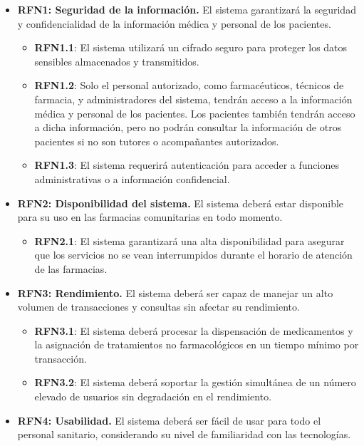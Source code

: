 \begin{itemize}
	\item \textbf{RFN1: Seguridad de la información.} El sistema garantizará la seguridad y confidencialidad de la información médica y personal de los pacientes.
	
	\begin{itemize}
		\item \textbf{RFN1.1}: El sistema utilizará un cifrado seguro para proteger los datos sensibles almacenados y transmitidos.
		\item \textbf{RFN1.2}: Solo el personal autorizado, como farmacéuticos, técnicos de farmacia, y administradores del sistema, tendrán acceso a la información médica y personal de los pacientes. Los pacientes también tendrán acceso a dicha información, pero no podrán consultar la información de otros pacientes si no son tutores o acompañantes autorizados.
		\item \textbf{RFN1.3}: El sistema requerirá autenticación para acceder a funciones administrativas o a información confidencial.
	\end{itemize}
	
	\item \textbf{RFN2: Disponibilidad del sistema.} El sistema deberá estar disponible para su uso en las farmacias comunitarias en todo momento.
	
	\begin{itemize}
		\item \textbf{RFN2.1}: El sistema garantizará una alta disponibilidad para asegurar que los servicios no se vean interrumpidos durante el horario de atención de las farmacias.
	\end{itemize}
	
	\item \textbf{RFN3: Rendimiento.} El sistema deberá ser capaz de manejar un alto volumen de transacciones y consultas sin afectar su rendimiento.
	
	\begin{itemize}
		\item \textbf{RFN3.1}: El sistema deberá procesar la dispensación de medicamentos y la asignación de tratamientos no farmacológicos en un tiempo mínimo por transacción.
		\item \textbf{RFN3.2}: El sistema deberá soportar la gestión simultánea de un número elevado de usuarios sin degradación en el rendimiento.
	\end{itemize}
	
	\item \textbf{RFN4: Usabilidad.} El sistema deberá ser fácil de usar para todo el personal sanitario, considerando su nivel de familiaridad con las tecnologías.
	

\end{itemize}
